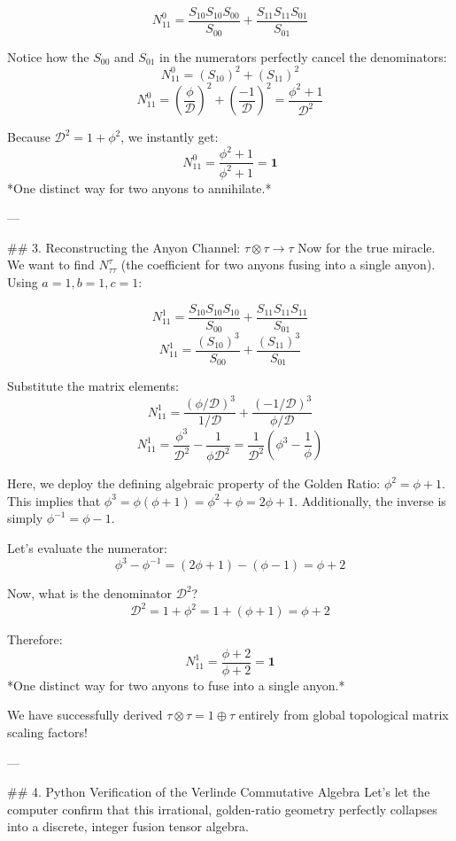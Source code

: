 $$ N_{11}^0 = \frac{S_{10} S_{10} S_{00}}{S_{00}} + \frac{S_{11} S_{11} S_{01}}{S_{01}} $$

Notice how the $S_{00}$ and $S_{01}$ in the numerators perfectly cancel the denominators:
$$ N_{11}^0 = (S_{10})^2 + (S_{11})^2 $$
$$ N_{11}^0 = \left( \frac{\phi}{\mathcal{D}} \right)^2 + \left( \frac{-1}{\mathcal{D}} \right)^2 = \frac{\phi^2 + 1}{\mathcal{D}^2} $$

Because $\mathcal{D}^2 = 1 + \phi^2$, we instantly get:
$$ N_{11}^0 = \frac{\phi^2 + 1}{\phi^2 + 1} = \mathbf{1} $$
*One distinct way for two anyons to annihilate.*

---

## 3. Reconstructing the Anyon Channel: $\tau \otimes \tau \to \tau$
Now for the true miracle. We want to find $N_{\tau\tau}^\tau$ (the coefficient for two anyons fusing into a single anyon). Using $a=1, b=1, c=1$:

$$ N_{11}^1 = \frac{S_{10} S_{10} S_{10}}{S_{00}} + \frac{S_{11} S_{11} S_{11}}{S_{01}} $$
$$ N_{11}^1 = \frac{(S_{10})^3}{S_{00}} + \frac{(S_{11})^3}{S_{01}} $$

Substitute the matrix elements:
$$ N_{11}^1 = \frac{(\phi/\mathcal{D})^3}{1/\mathcal{D}} + \frac{(-1/\mathcal{D})^3}{\phi/\mathcal{D}} $$
$$ N_{11}^1 = \frac{\phi^3}{\mathcal{D}^2} - \frac{1}{\phi \mathcal{D}^2} = \frac{1}{\mathcal{D}^2} \left( \phi^3 - \frac{1}{\phi} \right) $$

Here, we deploy the defining algebraic property of the Golden Ratio: $\phi^2 = \phi + 1$. 
This implies that $\phi^3 = \phi(\phi + 1) = \phi^2 + \phi = 2\phi + 1$. 
Additionally, the inverse is simply $\phi^{-1} = \phi - 1$. 

Let's evaluate the numerator:
$$ \phi^3 - \phi^{-1} = (2\phi + 1) - (\phi - 1) = \phi + 2 $$

Now, what is the denominator $\mathcal{D}^2$?
$$ \mathcal{D}^2 = 1 + \phi^2 = 1 + (\phi + 1) = \phi + 2 $$

Therefore:
$$ N_{11}^1 = \frac{\phi + 2}{\phi + 2} = \mathbf{1} $$
*One distinct way for two anyons to fuse into a single anyon.*

We have successfully derived $\tau \otimes \tau = 1 \oplus \tau$ entirely from global topological matrix scaling factors!

---

## 4. Python Verification of the Verlinde Commutative Algebra
Let's let the computer confirm that this irrational, golden-ratio geometry perfectly collapses into a discrete, integer fusion tensor algebra.

